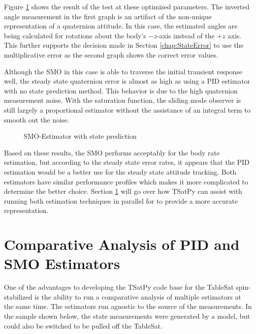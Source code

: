 Figure \ref{fig:SMOEstimatorwithstateprediction} shows the result of the test at these optimized parameters.  The inverted angle measurement in the first graph is an artifact of the non-unique representation of a quaternion attitude.  In this case, the estimated angles are being calculated for rotations about the body's $-z$-axis instead of the $+z$ axis.  This further supports the decision made in Section \ref{chap:StateError} to use the multiplicative error as the second graph shows the correct error values.

Although the SMO in this case is able to traverse the initial transient response well, the steady state quaternion error is almost as high as using a PID estimator with no state prediction method.  This behavior is due to the high quaternion measurement noise.  With the saturation function, the sliding mode observer is still largely a proportional estimator without the assistance of an integral term to smooth out the noise.

\begin{figure}[H]
  \centerline{}
  \caption{SMO-Estimator with state prediction}
  \label{fig:SMOEstimatorwithstateprediction}
\end{figure}

Based on these results, the SMO performs acceptably for the body rate estimation, but according to the steady state error rates, it appears that the PID estimation would be a better use for the steady state attitude tracking.  Both estimators have similar performance profiles which makes it more complicated to determine the better choice.  Section \ref{sec:ComparativeAnalysysofPIDandSMOEstimators} will go over how TSatPy can assist with running both estimation techniques in parallel for to provide a more accurate representation.

\section{Comparative Analysis of PID and SMO Estimators}
\label{sec:ComparativeAnalysysofPIDandSMOEstimators}

One of the advantages to developing the TSatPy code base for the TableSat spin-stabilized is the ability to run a comparative analysis of multiple estimators at the same time.  The estimators run agnostic to the source of the measurements.  In the sample shown below, the state measurements were generated by a model, but could also be switched to be pulled off the TableSat.

